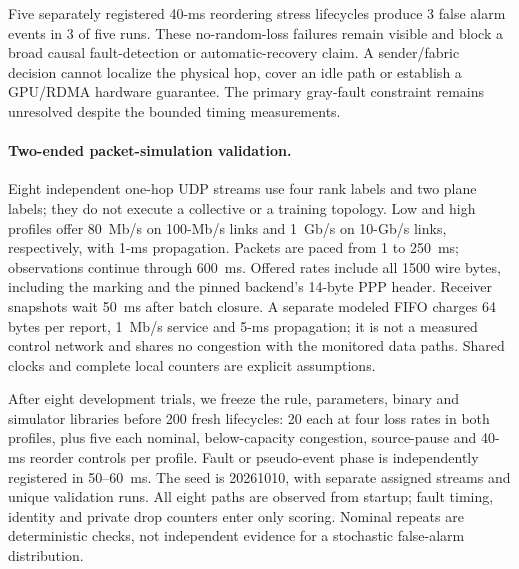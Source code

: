 \documentclass[sigconf]{acmart}
\begin{document}
Five separately registered 40-ms reordering stress lifecycles produce
3 false alarm events in 3 of five runs.
These no-random-loss failures remain visible and block a broad causal
fault-detection or automatic-recovery claim. A sender/fabric decision
cannot localize the physical hop, cover an idle path or establish a
GPU/RDMA hardware guarantee. The primary gray-fault constraint remains
unresolved despite the bounded timing measurements.


\paragraph{Two-ended packet-simulation validation.}
Eight independent one-hop UDP streams use four rank labels and two
plane labels; they do not execute a collective or a training topology.
Low and high profiles offer 80~Mb/s on 100-Mb/s links and 1~Gb/s on
10-Gb/s links, respectively, with 1-ms propagation. Packets are paced
from 1 to 250~ms; observations continue through 600~ms. Offered rates
include all 1500 wire bytes, including the marking and the pinned
backend's 14-byte PPP header. Receiver snapshots wait 50~ms after
batch closure. A separate modeled FIFO charges 64 bytes per report,
1~Mb/s service and 5-ms propagation; it is not a measured control
network and shares no congestion with the monitored data paths.
Shared clocks and complete local counters are explicit assumptions.

After eight development trials, we freeze the rule, parameters,
binary and simulator libraries before 200 fresh lifecycles: 20 each
at four loss rates in both profiles, plus five each nominal,
below-capacity congestion, source-pause and 40-ms reorder controls per
profile. Fault or pseudo-event phase is independently registered in
50--60~ms. The seed is 20261010, with separate assigned streams and
unique validation runs. All eight paths are observed from startup;
fault timing, identity and private drop counters enter only scoring.
Nominal repeats are deterministic checks, not independent evidence
for a stochastic false-alarm distribution.
\end{document}
